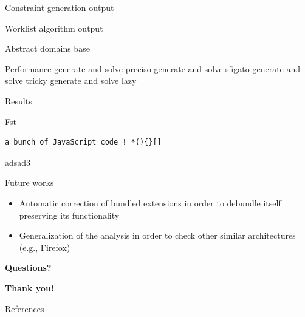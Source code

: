 \documentclass[11pt]{beamer}
\begin{document}
\begin{frame}{Constraint generation}
output
\end{frame}

\begin{frame}{Worklist algorithm}
output
\end{frame}

\begin{frame}{Abstract domains}
base
\end{frame}

\begin{frame}{Performance}
generate and solve preciso
generate and solve sfigato
generate and solve tricky
generate and solve lazy
\end{frame}

\begin{frame}{Results}

\end{frame}


\begin{frame}[fragile]{Fst}
\begin{lstlisting}
a bunch of JavaScript code !_*(){}[]
\end{lstlisting}
adsad3
\end{frame}

\begin{frame}{Future works}
\begin{itemize}
\item Automatic correction of bundled extensions in order to debundle itself preserving its functionality
\item Generalization of the analysis in order to check other similar architectures (e.g., Firefox)
\end{itemize}
\end{frame}

\begin{frame}
\begin{center}
{\Large \textbf{Questions?}}
\end{center}
\end{frame}

\begin{frame}
\begin{center}
{\Large \textbf{Thank you!}}
\end{center}
\end{frame}

\begin{frame}{References}
\begin{tiny}


\end{tiny}
\end{frame}
\end{document}
